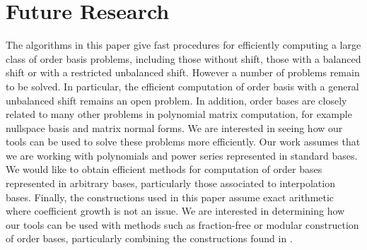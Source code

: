 
\section{Future Research\label{sec:Future-Research}}

The algorithms in this paper give fast procedures for efficiently
computing a large class of order basis problems, including those without
shift, those with a balanced shift or with a restricted unbalanced
shift. However a number of problems remain to be solved. In particular,
the efficient computation of order basis with a general unbalanced
shift remains an open problem. In addition, order bases are closely
related to many other problems in polynomial matrix computation, for
example nullspace basis and matrix normal forms. We are interested
in seeing how our tools can be used to solve these problems more efficiently.
Our work assumes that we are working with polynomials and power series
represented in standard bases. We would like to obtain efficient methods
for computation of order bases represented in arbitrary bases, particularly
those associated to interpolation bases. Finally, the constructions
used in this paper assume exact arithmetic where coefficient growth
is not an issue. We are interested in determining how our tools can
be used with methods such as fraction-free or modular construction
of order bases, particularly combining the constructions found in
\citep{BL2000}.
